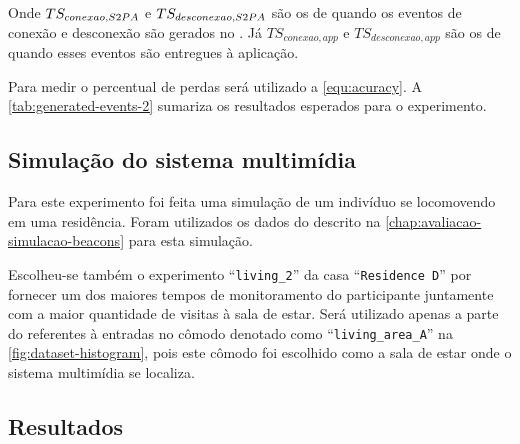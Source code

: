Onde $TS_{conexao,S2PA}$ e $TS_{desconexao,S2PA}$ são os \timestamps de quando os eventos de conexão e desconexão são gerados no \stwopa. Já $TS_{conexao,app}$ e $TS_{desconexao,app}$ são os \timestamps de quando esses eventos são entregues à aplicação.

Para medir o percentual de perdas será utilizado a \autoref{equ:acuracy}. A \autoref{tab:generated-events-2} sumariza os resultados esperados para o experimento.

\begin{table}[htb]
	\begin{center}
	\end{center}
\end{table}

\subsection{Simulação do sistema multimídia}

Para este experimento foi feita uma simulação de um indivíduo se locomovendo em uma residência. Foram utilizados os dados do \dataset descrito na \autoref{chap:avaliacao-simulacao-beacons} para esta simulação.

Escolheu-se também o experimento ``\texttt{living\_2}'' da casa ``\texttt{Residence D}'' por fornecer um dos maiores tempos de monitoramento do participante juntamente com a maior quantidade de visitas à sala de estar. Será utilizado apenas a parte do \dataset referentes à entradas no cômodo denotado como ``\texttt{living\_area\_A}'' na \autoref{fig:dataset-histogram}, pois este cômodo foi escolhido como a sala de estar onde o sistema multimídia se localiza.

\subsection{Resultados}




